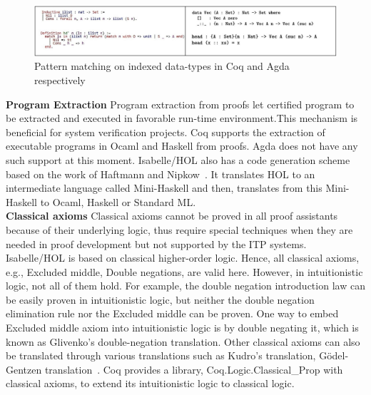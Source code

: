 \begin{figure}[H]
	\includegraphics[width=15cm]{figures/fig_1.JPG}
	\centering
	\caption{Pattern matching on indexed data-types in Coq and Agda respectively~\cite{Chlipala_CPDT_2013}~\cite{Norell_2009}}
	\label{fig:overview_1}
\end{figure}


\textbf{Program Extraction}
Program extraction from proofs let certified program to be extracted and executed in favorable run-time environment.This mechanism is beneficial for system verification projects. Coq supports the extraction of executable programs in Ocaml and Haskell from proofs. Agda does not have any such support at this moment. Isabelle/HOL also has a code generation scheme based on the work of Haftmann and Nipkow~\cite{Haftmann_Nipkow_2010}. It translates HOL to an intermediate language called Mini-Haskell and then, translates from this Mini-Haskell to Ocaml, Haskell or Standard ML. \\

\textbf{Classical axioms}
Classical axioms cannot be proved in all proof assistants because of their underlying logic, thus require special techniques when they are needed in proof development but not supported by the ITP systems. Isabelle/HOL is based on classical higher-order logic. Hence, all classical axioms, e.g., Excluded middle, Double negations, are valid here. However, in intuitionistic logic, not all of them hold. For example, the double negation introduction law can be easily proven in intuitionistic logic, but neither the double negation elimination rule nor the Excluded middle can be proven. One way to embed Excluded middle axiom into intuitionistic logic is by double negating it, which is known as Glivenko's double-negation translation. Other classical axioms can also be translated through various translations such as Kudro's translation, G{\"o}del-Gentzen translation~\cite{Yushkovskiy_Tripakis_2018}. Coq provides a library, Coq.Logic.Classical\_Prop with classical axioms, to extend its intuitionistic logic to classical logic. 













